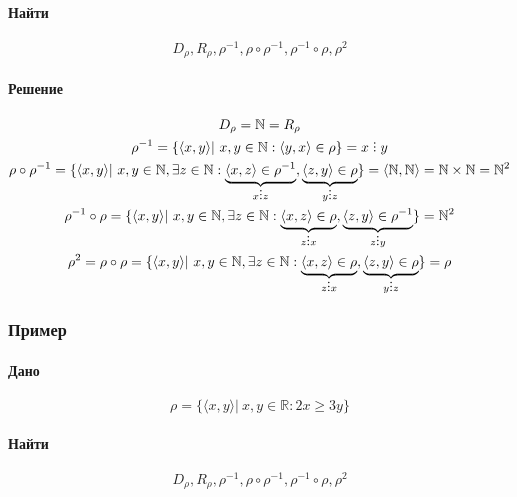 \documentclass{article}
\DeclareRobustCommand{\divby}{\mathrel{\vbox{\baselineskip.65ex\lineskiplimit0pt\hbox{.}\hbox{.}\hbox{.}}}}
\begin{document}
\paragraph{Найти}
\[
    D_{\rho}, R_{\rho}, \rho^{-1}, \rho \circ \rho^{-1}, \rho^{-1} \circ \rho, \rho^{2}
\]

\paragraph{Решение}
\begin{gather*}
    D_{\rho} = \mathbb{N} = R_{\rho} \\
    \rho^{-1} = \{\langle x, y \rangle |~x, y \in \mathbb{N}: \langle y, x \rangle \in \rho\} = x \divby y \\
    \rho \circ \rho^{-1} = 
    \{\langle x, y \rangle |~x, y \in \mathbb{N}, \exists z \in \mathbb{N}: \underbrace{\langle x, z \rangle \in \rho^{-1}}_{x \divby z}, \underbrace{\langle z, y \rangle \in \rho}_{y \divby z}\} = 
    \langle \mathbb{N}, \mathbb{N} \rangle = \mathbb{N} \times \mathbb{N} = \mathbb{N}^2 \\
    \rho^{-1} \circ \rho = 
    \{\langle x, y \rangle |~x, y \in \mathbb{N}, \exists z \in \mathbb{N}: \underbrace{\langle x, z \rangle \in \rho}_{z \divby x}, \underbrace{\langle z, y \rangle \in \rho^{-1}}_{z \divby y}\} = \mathbb{N}^2 \\
    \rho^2 = \rho \circ \rho = 
    \{\langle x, y \rangle |~x, y \in \mathbb{N}, \exists z \in \mathbb{N}: \underbrace{\langle x, z \rangle \in \rho}_{z \divby x}, \underbrace{\langle z, y \rangle \in \rho}_{y \divby z}\} = \rho \\
\end{gather*}

\subsubsection{Пример}
\paragraph{Дано}
\[
    \rho = \{\langle x, y \rangle |~x, y \in \mathbb{R}: 2x \ge 3y\}
\]

\paragraph{Найти}
\[
    D_{\rho}, R_{\rho}, \rho^{-1}, \rho \circ \rho^{-1}, \rho^{-1} \circ \rho, \rho^{2}
\]
\end{document}
